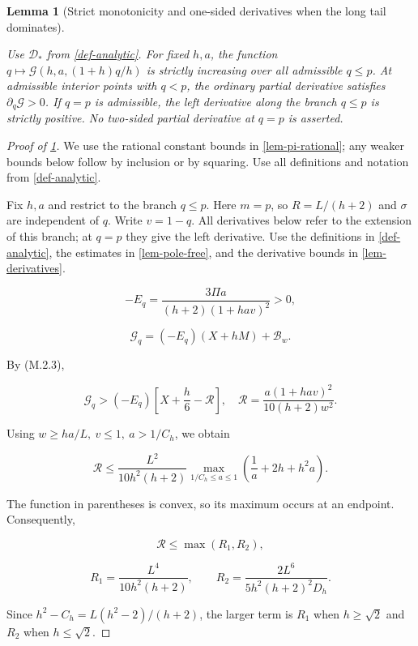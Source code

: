\documentclass[11pt,a4paper]{article}
\theoremstyle{proofmanuscript}
\newtheorem{lemma}[theorem]{Lemma}
\begin{document}
\begin{lemma}[Strict monotonicity and one-sided derivatives when the long tail dominates]\label{lem-q-branch-monotone}

Use \(\mathcal D_*\) from \ref{def-analytic}. For fixed \(h,a\), the function \(q\mapsto\mathcal G(h,a,(1+h)q/h)\) is strictly increasing over all admissible \(q\le p\). At admissible interior points with \(q<p\), the ordinary partial derivative satisfies \(\partial_q\mathcal G>0\). If \(q=p\) is admissible, the left derivative along the branch \(q\le p\) is strictly positive. No two-sided partial derivative at \(q=p\) is asserted.

\end{lemma}

\begin{proof}[Proof of \ref{lem-q-branch-monotone}]

We use the rational constant bounds in \ref{lem-pi-rational}; any weaker bounds below follow by inclusion or by squaring. Use all definitions and notation from \ref{def-analytic}.

Fix \(h,a\) and restrict to the branch \(q\le p\). Here \(m=p\), so \(R=L/(h+2)\) and \(\sigma\) are independent of \(q\). Write \(v=1-q\). All derivatives below refer to the extension of this branch; at \(q=p\) they give the left derivative. Use the definitions in \ref{def-analytic}, the estimates in \ref{lem-pole-free}, and the derivative bounds in \ref{lem-derivatives}.

\[
-E_q=\frac{3\Pi a}{(h+2)(1+hav)^2}>0,
\]

\[
\mathcal G_q=(-E_q)(X+hM)+\mathcal B_w.
\]

By (M.2.3),

\[
\mathcal G_q>
(-E_q)\left[X+\frac h6-\mathcal R\right],\quad
\mathcal R=\frac{a(1+hav)^2}{10(h+2)w^2}.                 \tag{M.3.2}
\]

Using \(w\ge ha/L,\ v\le1,\ a>1/C_h\), we obtain

\[
\mathcal R\le
\frac{L^2}{10h^2(h+2)}
\max_{1/C_h\le a\le1}\left(\frac1a+2h+h^2a\right).
\]

The function in parentheses is convex, so its maximum occurs at an endpoint. Consequently,

\[
\mathcal R\le\max(R_1,R_2),
\]

\[
R_1=\frac{L^4}{10h^2(h+2)},\qquad
R_2=\frac{2L^6}{5h^2(h+2)^2D_h}.                         \tag{M.3.3}
\]

Since \(h^2-C_h=L(h^2-2)/(h+2)\), the larger term is \(R_1\) when \(h\ge\sqrt2\) and \(R_2\) when \(h\le\sqrt2\).


\end{proof}
\end{document}
